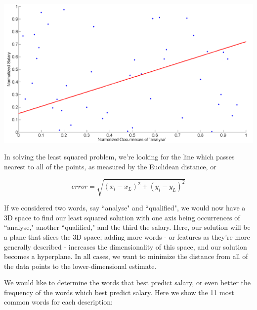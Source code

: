 \documentclass[12pt]{article}
\begin{document}
    \begin{center}
    \includegraphics[width=\linewidth]{figLSE}
    \end{center}
    
    In solving the least squared problem, we're looking for the line which
    passes nearest to all of the points, as measured by the Euclidean distance,
    or

    \begin{equation}
    error = \sqrt{ (x_i - x_L)^2 + (y_i - y_L)^2} 
    \end{equation}
 
    If we considered two words, say ``analyse" and ``qualified", we would now
    have a 3D space to find our least squared solution with one axis being
    occurrences of ``analyse," another ``qualified," and the third the salary.
    Here, our solution will be a plane that slices the 3D space; adding more
    words - or features as they're more generally described - increases the
    dimensionality of this space, and our solution becomes a hyperplane.  In
    all cases, we want to minimize the distance from all of the data points to
    the lower-dimensional estimate.
    
    We would like to determine the words that best predict salary, or even
    better the frequency of the words which best predict salary. Here we show
    the 11 most common words for each description:
\end{document}
